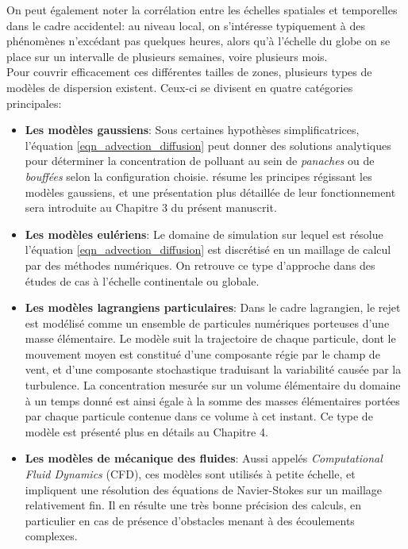 	On peut également noter la corrélation entre les échelles spatiales et temporelles dans le cadre accidentel: au niveau local, on s'intéresse typiquement à des phénomènes n'excédant pas quelques heures, alors qu'à l'échelle du globe on se place sur un intervalle de plusieurs semaines, voire plusieurs mois.\\ 
	
	Pour couvrir efficacement ces différentes tailles de zones, plusieurs types de modèles de dispersion existent. Ceux-ci se divisent en quatre catégories principales:\\
	
	\begin{itemize} 
		
	\item \textbf{Les modèles gaussiens}:
	Sous certaines hypothèses simplificatrices, l'équation \eqref{eqn_advection_diffusion} peut donner des solutions analytiques pour déterminer la concentration de polluant au sein de \textit{panaches} ou de \textit{bouffées} selon la configuration choisie. \cite{Stockie2011} résume les principes régissant les modèles gaussiens, et une présentation plus détaillée de leur fonctionnement sera introduite au Chapitre 3 du présent manuscrit.\\
	
	\item \textbf{Les modèles eulériens}:
	Le domaine de simulation sur lequel est résolue l'équation \eqref{eqn_advection_diffusion} est discrétisé en un maillage de calcul  par des méthodes numériques. On retrouve ce type d'approche dans des études de cas à l'échelle continentale \cite{Saunier2013} ou globale. \\
	
	\item \textbf{Les modèles lagrangiens particulaires}:
	Dans le cadre lagrangien, le rejet est modélisé comme un ensemble de particules numériques porteuses d'une masse élémentaire. Le modèle suit la trajectoire de chaque particule, dont le mouvement moyen est constitué d'une composante régie par le champ de vent, et d'une composante stochastique traduisant la variabilité causée par la turbulence. La concentration mesurée sur un volume élémentaire du domaine à un temps donné est ainsi égale à la somme des masses élémentaires portées par chaque particule contenue dans ce volume à cet instant. Ce type de modèle est présenté plus en détails au Chapitre 4.\\
	
	\item \textbf{Les modèles de mécanique des fluides}:
	Aussi appelés \textit{Computational Fluid Dynamics} (CFD), ces modèles sont utilisés à petite échelle, et impliquent une résolution des équations de Navier-Stokes sur un maillage relativement fin. Il en résulte une {très} bonne précision des calculs, en particulier en cas de présence d'obstacles menant à des écoulements complexes.\\
	
	\end{itemize}
	
